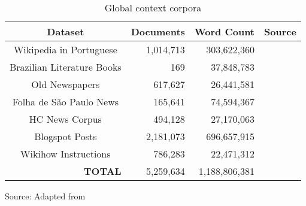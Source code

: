 \begin{table}[htb]
\caption{Global context corpora}
\label{tab:global_corpora}
\centering
\begin{tabular}{@{}crrc@{}}
\toprule
\textbf{Dataset}                   & \textbf{Documents} & \textbf{Word Count} & \textbf{Source} \\ \midrule
Wikipedia in Portuguese            & 1,014,713          & 303,622,360         & \textcite{Wikipedia2019}                \\\hdashline
Brazilian Literature Books         & 169                & 37,848,783          & \textcite{Tatman2017}                 \\\hdashline
Old Newspapers                     & 617,627            & 26,441,581          &         \textcite{Tan2020}     \\\hdashline
Folha de São Paulo News            & 165,641            & 74,594,367          &                     \textcite{Marlessonn2019}             \\\hdashline
HC News Corpus                     & 494,128            & 27,170,063          &        \textcite{Christensen2016}         \\\hdashline
Blogspot Posts                     & 2,181,073          & 696,657,915         &          \textcite{Santos2018}       \\\hdashline
Wikihow Instructions               & 786,283            & 22,471,312          &        \textcite{Chocron2018}         \\ \midrule
\multicolumn{1}{r}{\textbf{TOTAL}} & 5,259,634          & 1,188,806,381       & \textbf{}       \\ \bottomrule
\end{tabular}

Source: Adapted from \textcite{DalPont2020}
\end{table}
